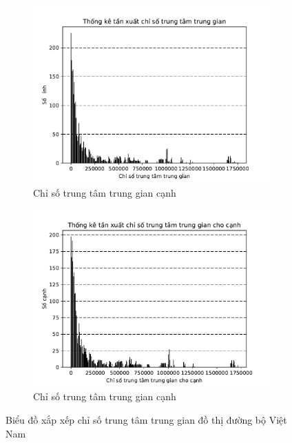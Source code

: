 \documentclass[14pt, oneside, a4paper, openany]{scrartcl}
\begin{document}
\begin{figure}[!h]
	\centering
	\begin{subfigure}{.5\textwidth}
		\centering
		\includegraphics[scale=0.5]{figures/betweeness_dist.pdf}
		\caption{Chỉ số trung tâm trung gian cạnh}
		\label{fig:betweenessdist}
	\end{subfigure}%
	\begin{subfigure}{.5\textwidth}
		\centering
		\includegraphics[scale=0.5]{figures/betweeness_edge_dist.pdf}
		\caption{Chỉ số trung tâm trung gian cạnh}
		\label{fig:betweenessedgedist}
	\end{subfigure}
	\caption{Biểu đồ xắp xếp chỉ số trung tâm trung gian đồ thị đường bộ Việt Nam}
	\label{fig:between}
\end{figure}
\end{document}

